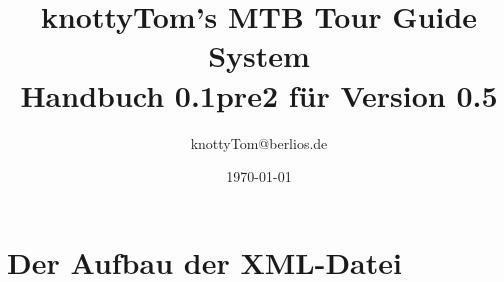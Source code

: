 \documentclass[a4paper,10pt,titlepage]{article}
\title{knottyTom's MTB Tour Guide System\\Handbuch 0.1pre2 f\"ur Version 0.5}
\author{knottyTom@berlios.de}
\date{\today}
\begin{document}
\pagestyle{headings}
\setlength{\parskip}{5pt}
\setlength{\parindent}{0pt}

\maketitle
\newpage

\tableofcontents
\newpage



\newpage


\newpage


\newpage



\newpage


\newpage
\section{Der Aufbau der  XML-Datei}\label{sec:xml-structure} 
% 
\end{document}
